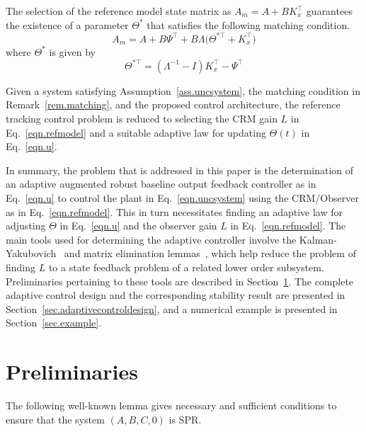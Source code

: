 \documentclass[]{../sty/JGCD}
\theoremstyle{examplestyle}
\begin{document}
  \begin{rem-dan}\label{rem.matching}
    The selection of the reference model state matrix as $A_{m}=A+BK_{x}^{\top}$ guarantees the existence of a parameter $\Theta^{*}$ that satisfies the following matching condition.
    \begin{equation*}
      A_{m}=A+B\Psi^{\top}+B\Lambda\bigr(\Theta^{*\top}+K_{x}^{\top}\bigr)
    \end{equation*}
    where $\Theta^{*}$ is given by
    \begin{equation*}
      \Theta^{*\top}=(\Lambda^{-1}-I)K_{x}^{\top}-\Psi^{\top}
    \end{equation*}
  \end{rem-dan}

  Given a system satisfying Assumption~\ref{ass.uncsystem}, the matching condition in Remark~\ref{rem.matching}, and the proposed control architecture, the reference tracking control problem is reduced to selecting the CRM gain $L$ in Eq.\ \eqref{eqn.refmodel} and a suitable adaptive law for updating $\Theta(t)$ in Eq.\ \eqref{eqn.u}.

  In summary, the problem that is addressed in this paper is the determination of an adaptive augmented robust baseline output feedback controller as in Eq.\ \eqref{eqn.u} to control the plant in Eq.\ \eqref{eqn.uncsystem} using the CRM/Observer as in Eq.\ \eqref{eqn.refmodel}.
  This in turn necessitates finding an adaptive law for adjusting $\Theta$ in Eq.\ \eqref{eqn.u} and the observer gain $L$ in Eq.\ \eqref{eqn.refmodel}.
  The main tools used for determining the adaptive controller involve the Kalman-Yakubovich\ \cite{narendra.stable.2005} and matrix elimination lemmas\ \cite{boyd.lmibook.1994}, which help reduce the problem of finding $L$ to a state feedback problem of a related lower order subsystem.
  Preliminaries pertaining to these tools are described in Section~\ref{sec.preliminaries}.
  The complete adaptive control design and the corresponding stability result are presented in Section~\ref{sec.adaptivecontroldesign}, and a numerical example is presented in Section~\ref{sec.example}.

  \section{Preliminaries}\label{sec.preliminaries}

  The following well-known lemma gives necessary and sufficient conditions to ensure that the system $(A,B,C,0)$ is SPR.\@
\end{document}
